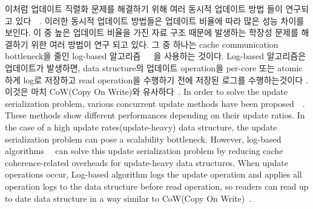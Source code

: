 \ifkor
이처럼 업데이트 직렬화 문제를 해결하기 위해 여러 동시적 업데이트 방법 들이 연구되고
있다~\cite{Arbel2014ConcurrentRCU}~\cite{Matveev2015RLU}.
이러한 동시적 업데이트 방법들은 업데이트 비율에 따라 많은 성능 차이를
보인다.
이 중 높은 업데이트 비율을 가진 자료 구조 때문에 발생하는 학장성 문제를 해결하기 위한 여러 방법이 연구 되고
있다.
그 중 하나는 cache communication bottleneck을 줄인 log-based
알고리즘~\cite{Shalev2006PLS}~\cite{Hendler2010FC}~\cite{SilasBoydWickizerPth}을
사용하는 것이다.
Log-based 알고리즘은 업데이트가 발생하면, data structure의 업데이트 operation을
per-core 또는 atomic하게 log로 저장하고 read operation을 수행하기 전에 저장된 로그를 수행하는것이다 .
이것은 마치 CoW(Copy On Write)와 유사하다~\cite{PaulDetailLWN}.
\else
In order to solve the update serialization problem, various concurrent update
methods have been proposed~\cite{Arbel2014ConcurrentRCU}~\cite{Matveev2015RLU}.
These methods show different performances depending on their update ratios.
In the case of a high update rates(update-heavy) data structure, the
update serialization problem can pose a scalability bottleneck.
However, log-based algorithms~\cite{Hendler2010FC}~\cite{SilasBoydWickizerPth}
can solve this update serialization problem by reducing cache coherence-related
overheads for update-heavy data structures.
When update operations occur, Log-based algorithm logs the update
operation and applies all operation logs to the data structure
before read operation, so readers can read up to date data structure in a way
similar to CoW(Copy On Write)~\cite{PaulDetailLWN}.

